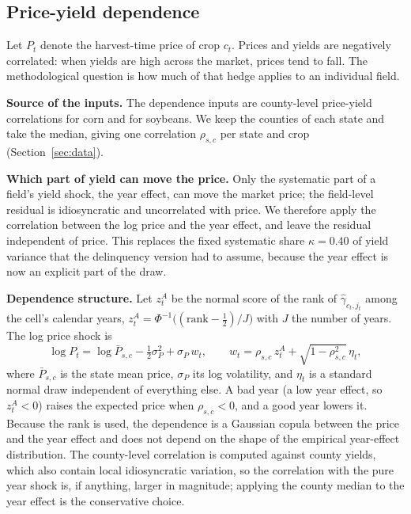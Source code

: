 \documentclass[11pt,letterpaper]{article}
\theoremstyle{remark}
\begin{document}
\subsection{\label{subsec:py_corr}Price-yield dependence}

Let $P_t$ denote the harvest-time price of crop $c_t$. Prices and yields are negatively correlated: when yields are high across the market, prices tend to fall. The methodological question is how much of that hedge applies to an individual field.

\textbf{Source of the inputs.} The dependence inputs are county-level price-yield correlations for corn and for soybeans. We keep the counties of each state and take the median, giving one correlation $\rho_{s,c}$ per state and crop (Section~\ref{sec:data}).

\textbf{Which part of yield can move the price.} Only the systematic part of a field's yield shock, the year effect, can move the market price; the field-level residual is idiosyncratic and uncorrelated with price. We therefore apply the correlation between the log price and the year effect, and leave the residual independent of price. This replaces the fixed systematic share $\kappa = 0.40$ of yield variance that the delinquency version had to assume, because the year effect is now an explicit part of the draw.

\textbf{Dependence structure.} Let $z^A_t$ be the normal score of the rank of $\hat\gamma_{c_t,j_t}$ among the cell's calendar years, $z^A_t = \Phi^{-1}\big((\mathrm{rank}-\tfrac12)/J\big)$ with $J$ the number of years. The log price shock is
\begin{equation}
\log P_t = \log\bar P_{s,c} - \tfrac12\sigma_{P}^2 + \sigma_{P}\, w_t, \qquad w_t = \rho_{s,c}\, z^A_t + \sqrt{1-\rho_{s,c}^2}\,\eta_t, \label{eq:price}
\end{equation}
where $\bar P_{s,c}$ is the state mean price, $\sigma_P$ its log volatility, and $\eta_t$ is a standard normal draw independent of everything else. A bad year (a low year effect, so $z^A_t<0$) raises the expected price when $\rho_{s,c}<0$, and a good year lowers it. Because the rank is used, the dependence is a Gaussian copula between the price and the year effect and does not depend on the shape of the empirical year-effect distribution. The county-level correlation is computed against county yields, which also contain local idiosyncratic variation, so the correlation with the pure year shock is, if anything, larger in magnitude; applying the county median to the year effect is the conservative choice.
\end{document}
